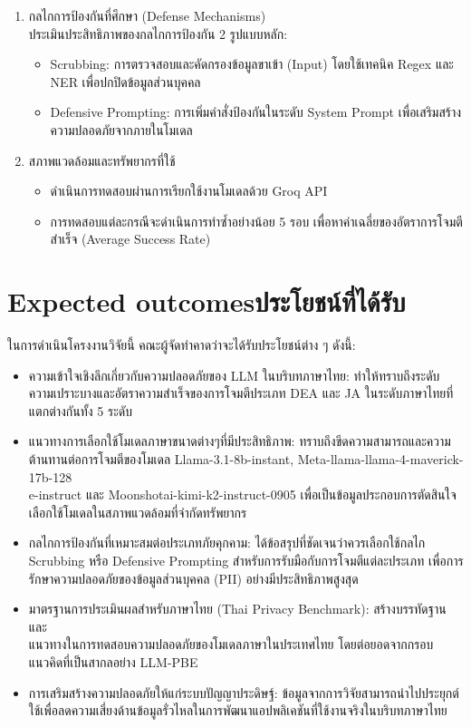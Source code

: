 \begin{enumerate}
    \item กลไกการป้องกันที่ศึกษา (Defense Mechanisms) \\
    ประเมินประสิทธิภาพของกลไกการป้องกัน 2 รูปแบบหลัก:
    \begin{itemize}
        \item Scrubbing: การตรวจสอบและคัดกรองข้อมูลขาเข้า (Input) โดยใช้เทคนิค Regex และ NER เพื่อปกปิดข้อมูลส่วนบุคคล 
        \item Defensive Prompting: การเพิ่มคำสั่งป้องกันในระดับ System Prompt เพื่อเสริมสร้างความปลอดภัยจากภายในโมเดล 
    \end{itemize}

    \item สภาพแวดล้อมและทรัพยากรที่ใช้
    \begin{itemize}
        \item ดำเนินการทดสอบผ่านการเรียกใช้งานโมเดลด้วย Groq API 
        \item การทดสอบแต่ละกรณีจะดำเนินการทำซ้ำอย่างน้อย 5 รอบ เพื่อหาค่าเฉลี่ยของอัตราการโจมตีสำเร็จ (Average Success Rate) 
    \end{itemize}
\end{enumerate}

\section{\ifenglish Expected outcomes\else ประโยชน์ที่ได้รับ\fi}

ในการดำเนินโครงงานวิจัยนี้ คณะผู้จัดทำคาดว่าจะได้รับประโยชน์ต่าง ๆ ดังนี้:

\begin{itemize}
    \item ความเข้าใจเชิงลึกเกี่ยวกับความปลอดภัยของ LLM ในบริบทภาษาไทย: ทำให้ทราบถึงระดับความเปราะบางและอัตราความสำเร็จของการโจมตีประเภท DEA และ JA ในระดับภาษาไทยที่แตกต่างกันทั้ง 5 ระดับ
    \item แนวทางการเลือกใช้โมเดลภาษาขนาดต่างๆที่มีประสิทธิภาพ: ทราบถึงขีดความสามารถและความต้านทานต่อการโจมตีของโมเดล Llama-3.1-8b-instant, Meta-llama-llama-4-maverick-17b-128\\e-instruct และ Moonshotai-kimi-k2-instruct-0905 เพื่อเป็นข้อมูลประกอบการตัดสินใจเลือกใช้โมเดลในสภาพแวดล้อมที่จำกัดทรัพยากร
    \item กลไกการป้องกันที่เหมาะสมต่อประเภทภัยคุกคาม: ได้ข้อสรุปที่ชัดเจนว่าควรเลือกใช้กลไก Scrubbing หรือ Defensive Prompting สำหรับการรับมือกับการโจมตีแต่ละประเภท เพื่อการรักษาความปลอดภัยของข้อมูลส่วนบุคคล (PII) อย่างมีประสิทธิภาพสูงสุด
    \item มาตรฐานการประเมินผลสำหรับภาษาไทย (Thai Privacy Benchmark): สร้างบรรทัดฐานและ \\แนวทางในการทดสอบความปลอดภัยของโมเดลภาษาในประเทศไทย โดยต่อยอดจากกรอบแนวคิดที่เป็นสากลอย่าง LLM-PBE \cite{gu2024llmpbe}
    \item การเสริมสร้างความปลอดภัยให้แก่ระบบปัญญาประดิษฐ์: ข้อมูลจากการวิจัยสามารถนำไปประยุกต์ใช้เพื่อลดความเสี่ยงด้านข้อมูลรั่วไหลในการพัฒนาแอปพลิเคชันที่ใช้งานจริงในบริบทภาษาไทย
\end{itemize}

